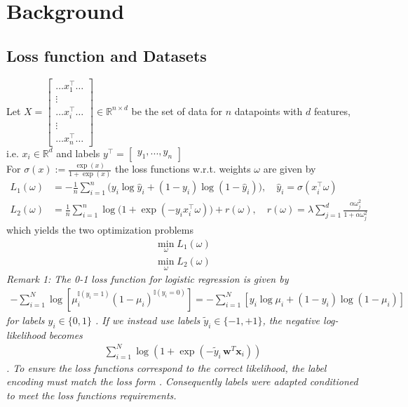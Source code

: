 \documentclass{article}
\begin{document}
\section{Background}
\subsection{Loss function and Datasets}
Let 
$X = 
\begin{bmatrix}
\hdots x_1^\top \hdots \\
\vdots \\
\hdots x_i^\top \hdots\\
\vdots \\
\hdots x_n^\top \hdots
\end{bmatrix}
\in \mathbb{R}^{n \times d}$ \quad be the set of data for $n$ datapoints with $d$ features, i.e. $x_i \in \mathbb{R}^d$ and labels $y^\top = \begin{bmatrix} y_1,...,y_n\end{bmatrix}$\\
For $\sigma(x) := \frac{\exp(x)}{1+\exp(x)}$ the loss functions w.r.t. weights $\omega$ are given by
\begin{align}
L_1(\omega) &= -\frac{1}{n} \sum_{i=1}^{n} \Big( y_i \log \hat{y}_i + (1 - y_i) \log (1 - \hat{y}_i) \Big), \quad \hat{y}_i = \sigma(x_i^\top \omega) \\
L_2(\omega) &= \frac{1}{n} \sum_{i=1}^{n} \log\big(1 + \exp(-y_i x_i^\top \omega)\big) + r(\omega), \quad
r(\omega) = \lambda \sum_{j=1}^{d} \frac{\alpha \omega _j^2}{1 + \alpha \omega _j^2}
\end{align}
which yields the two optimization problems
\begin{align}
  \min _{\omega} L_1(\omega)\\
  \min _{\omega} L_2(\omega)
\end{align}
\textit{Remark 1: The 0-1 loss function for logistic regression is given by
\begin{align*}
  -\sum_{i=1}^N \log\left[ \mu_i^{\mathbb{I}(y_i=1)} (1-\mu_i)^{\mathbb{I}(y_i=0)} \right] 
  =  -\sum_{i=1}^N \left[ y_i \log \mu_i + (1 - y_i) \log(1-\mu_i) \right]
\end{align*}
for labels $y_i \in \{0,1\}$ \cite[Eq.~8.2--8.3]{murphy2012ml}.
If we instead use labels $\tilde{y}_i \in \{-1, +1\}$, the negative log-likelihood becomes
\begin{align*}
  \sum_{i=1}^N \log\left(1 + \exp(-\tilde{y}_i\,\mathbf{w}^T\mathbf{x}_i)\right)
\end{align*}
\cite[Eq.~8.4]{murphy2012ml}.
To ensure the loss functions correspond to the correct likelihood, the label encoding must match the loss form \cite[Sec.~8.3.1]{murphy2012ml}. Consequently labels were adapted conditioned to meet the loss functions requirements.}\\
\end{document}
